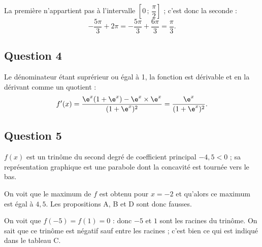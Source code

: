 La première n'appartient pas à l'intervalle \(\left[0 \,;\, \dfrac{\pi}{2} \right]\) ; c'est donc la seconde :
\[
-\dfrac{5\pi}{3} + 2\pi = -\dfrac{5\pi}{3} + \dfrac{6\pi}{3} = \dfrac{\pi}{3}.
\]

\subsection*{Question 4}

Le dénominateur étant suprérieur ou égal à 1, la fonction est dérivable et en la dérivant comme un quotient :
\[
f'(x) = \dfrac{\e^x (1 + \e^x) - \e^x \times \e^x}{(1 + \e^x)^2} = \dfrac{\e^x}{(1 + \e^x)^2}.
\]

\subsection*{Question 5}

\( f(x) \) est un trinôme du second degré de coefficient principal \(-4{,}5 < 0\) ; sa représentation graphique est une parabole dont la concavité est tournée vers le bas.

On voit que le maximum de \( f \) est obtenu pour \( x = -2 \) et qu'alors ce maximum est égal à \( 4{,}5 \). Les propositions A, B et D sont donc fausses.

On voit que \( f(-5) = f(1) = 0 \) : donc \(-5\) et \(1\) sont les racines du trinôme. On sait que ce trinôme est négatif sauf entre les racines ; c'est bien ce qui est indiqué dans le tableau C.
